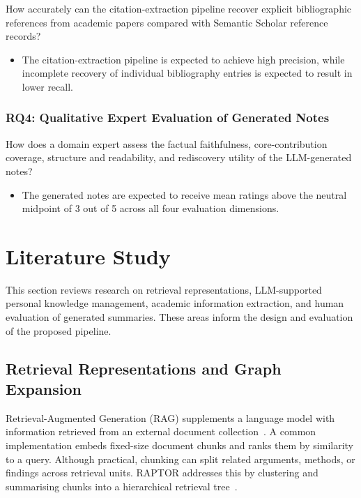 \documentclass[runningheads]{llncs}
\begin{document}
How accurately can the citation-extraction pipeline recover explicit
bibliographic references from academic papers compared with Semantic
Scholar reference records?

\begin{itemize}
\item[\textbf{H3:}] The citation-extraction pipeline is expected to
achieve high precision, while incomplete recovery of individual
bibliography entries is expected to result in lower recall.
\end{itemize}

\subsubsection{RQ4: Qualitative Expert Evaluation of Generated Notes}

How does a domain expert assess the factual faithfulness,
core-contribution coverage, structure and readability, and rediscovery
utility of the LLM-generated notes?

\begin{itemize}
\item[\textbf{H4:}] The generated notes are expected to receive mean
ratings above the neutral midpoint of 3 out of 5 across all four
evaluation dimensions.
\end{itemize}


\section{Literature Study}
\label{sec:literature}

This section reviews research on retrieval representations,
LLM-supported personal knowledge management, academic information
extraction, and human evaluation of generated summaries. These areas
inform the design and evaluation of the proposed pipeline.

\subsection{Retrieval Representations and Graph Expansion}

Retrieval-Augmented Generation (RAG) supplements a language model with
information retrieved from an external document
collection~\cite{lewis2020retrieval}. A common implementation embeds
fixed-size document chunks and ranks them by similarity to a query.
Although practical, chunking can split related arguments, methods, or
findings across retrieval units. RAPTOR addresses this by clustering and
summarising chunks into a hierarchical retrieval
tree~\cite{sarthi2024raptor}.
\end{document}
